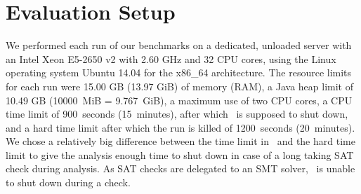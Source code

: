 \section{Evaluation Setup}
We performed each run of our benchmarks on a dedicated, unloaded server with an Intel Xeon E5-2650 v2 with 2.60 GHz and 32 CPU cores, using the Linux operating system Ubuntu 14.04 for the x86\_64 architecture.
The resource limits for each run were 15.00 GB (13.97 GiB) of memory (RAM), a Java heap limit of 10.49 GB (10000~MiB = 9.767~GiB),
a maximum use of two CPU cores,
a CPU time limit of 900~seconds (15~minutes), after which \cpaChecker\ is supposed to shut down,
and a hard time limit after which the run is killed of 1200~seconds (20~minutes).
We chose a relatively big difference between the time limit in \cpaChecker\ and the hard time limit to give the analysis enough time to shut down in case of a long taking SAT check during analysis.
As SAT checks are delegated to an SMT solver, \cpaChecker\ is unable to shut down during a check.

